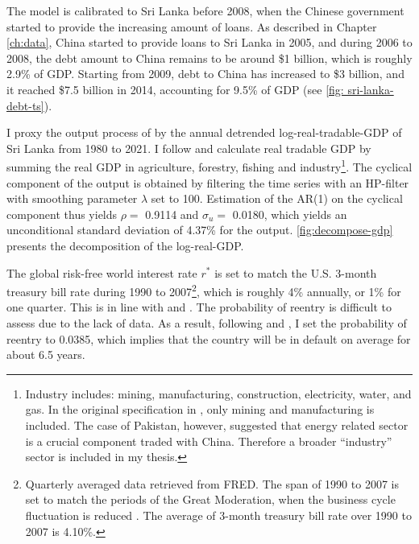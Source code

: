 The model is calibrated to Sri Lanka before 2008, when the Chinese government started to provide the increasing amount of loans.
As described in Chapter \ref{ch:data}, China started to provide loans to Sri Lanka in 2005, and during 2006 to 2008, the debt amount to China remains to be around \$1 billion, which is roughly 2.9\% of GDP. Starting from 2009, debt to China has increased to \$3 billion, and it reached \$7.5 billion in 2014, accounting for 9.5\% of GDP
(see \autoref{fig: sri-lanka-debt-ts}).

I proxy the output process of  by the annual detrended log-real-tradable-GDP of Sri Lanka from 1980 to 2021. I follow \citet{Na-18} and calculate real tradable GDP by summing the real GDP in agriculture, forestry, fishing and industry\footnote{
    Industry includes: mining, manufacturing, construction, electricity, water, and gas. In the original specification in \citet{Na-18}, only mining and manufacturing is included. The case of Pakistan, however, suggested that energy related sector is a crucial component traded with China. Therefore a broader ``industry'' sector is included in my thesis.
}. The cyclical component of the output is obtained by filtering the time series with an HP-filter with smoothing parameter $\lambda$ set to 100.
Estimation of the AR(1) on the cyclical component thus yields $\rho = $ 0.9114 and $\sigma_u = $ 0.0180, which yields an unconditional standard deviation of 4.37\% for the output\footnotemark{}. \autoref{fig:decompose-gdp} presents the decomposition of the log-real-GDP.

The global risk-free world interest rate $r^*$ is set to match the U.S. 3-month treasury bill rate during 1990 to 2007\footnote{
    Quarterly averaged data retrieved from FRED. The span of 1990 to 2007 is set to match the periods of the Great Moderation, when the business cycle fluctuation is reduced \citep{FedHistory-GreatModeration}. The average of 3-month treasury bill rate over 1990 to 2007 is 4.10\%.
}, which is roughly 4\% annually, or 1\% for one quarter. This is in line with \citet{Chatterjee-12} and \citet{Na-18}.
The probability of reentry is difficult to assess due to the lack of data. As a result, following \citet*{Chatterjee-12} and \citet*{Hinrichsen_2020-chapter4}, I set the probability of reentry to 0.0385, which implies that the country will be in default on average for about 6.5 years.

